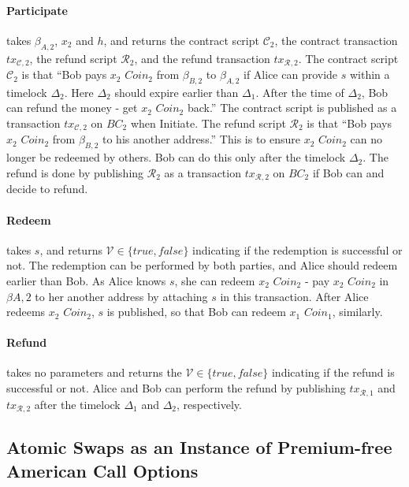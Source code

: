 \paragraph{Participate}
takes $\beta_{A, 2}$, $x_2$ and $h$,
and returns the contract script $\mathcal{C}_2$, the contract transaction $tx_{\mathcal{C}, 2}$, the refund script $\mathcal{R}_2$, and the refund transaction $tx_{\mathcal{R}, 2}$.
The contract script $\mathcal{C}_2$ is that ``Bob pays $x_2$ $Coin_2$ from $\beta_{B, 2}$ to $\beta_{A, 2}$ if Alice can provide $s$ within a timelock $\Delta_2$. Here $\Delta_2$ should expire earlier than $\Delta_1$. After the time of $\Delta_2$, Bob can refund the money - get $x_2$ $Coin_2$ back.''
The contract script is published as a transaction $tx_{\mathcal{C}, 2}$ on $BC_2$ when Initiate.
The refund script $\mathcal{R}_2$ is that ``Bob pays $x_2$ $Coin_2$ from $\beta_{B, 2}$ to his another address.'' This is to ensure $x_2$ $Coin_2$ can no longer be redeemed by others. Bob can do this only after the timelock $\Delta_2$.
The refund is done by publishing $\mathcal{R}_2$ as a transaction $tx_{\mathcal{R}, 2}$ on $BC_2$ if Bob can and decide to refund.

\paragraph{Redeem}
takes $s$,
and returns $\mathcal{V} \in \{true, false\}$ indicating if the redemption is successful or not.
The redemption can be performed by both parties, and Alice should redeem earlier than Bob.
As Alice knows $s$, she can redeem $x_2$ $Coin_2$ - pay $x_2$ $Coin_2$ in $\beta{A, 2}$ to her another address by attaching $s$ in this transaction.
After Alice redeems $x_2$ $Coin_2$, $s$ is published, so that Bob can redeem $x_1$ $Coin_1$, similarly.

\paragraph{Refund}
takes no parameters and returns the $\mathcal{V} \in \{true, false\}$ indicating if the refund is successful or not.
Alice and Bob can perform the refund by publishing $tx_{\mathcal{R}, 1}$ and $tx_{\mathcal{R}, 2}$ after the timelock $\Delta_1$ and $\Delta
_2$, respectively.



\subsection{Atomic Swaps as an Instance of Premium-free American Call Options}

